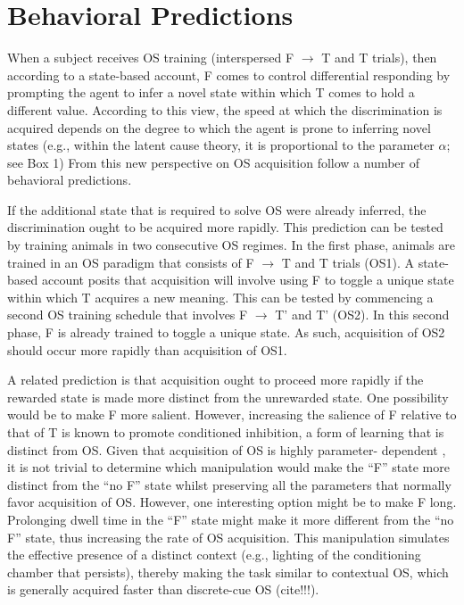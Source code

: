 \documentclass[11pt]{article}
\let\cite=\citep
\begin{document}
\section*{Behavioral Predictions}

When a subject receives OS training (interspersed F $\rightarrow$ T and T 
trials), then according to a state-based account, F comes to control 
differential responding by prompting the agent to infer a novel state within 
which T comes to hold a different value. According to this view, the speed at 
which the discrimination is acquired depends on the degree to which the agent 
is prone to inferring novel states (e.g., within the latent cause theory, it is 
proportional to the parameter $\alpha$; see Box 1) From this new perspective on 
OS acquisition follow a number of behavioral predictions.

If the additional state that is required to solve OS were already inferred, the 
discrimination ought to be acquired more rapidly. This prediction can be tested 
by training animals in two consecutive OS regimes. In the first phase, animals 
are trained in an OS paradigm that consists of F $\rightarrow$ T and T trials 
(OS1). A state-based account posits that acquisition will involve using F to 
toggle a unique state within which T acquires a new meaning. This can be tested 
by commencing a second OS training schedule that involves F $\rightarrow$ T' 
and T' (OS2). In this second phase, F is already trained to toggle a unique 
state. As such, acquisition of OS2 should occur more rapidly than acquisition 
of OS1. 

A related prediction is that acquisition ought to proceed more rapidly if the 
rewarded state is made more distinct from the unrewarded state. One possibility 
would be to make F more salient. However, increasing the salience of F relative 
to that of T is known to promote conditioned inhibition, a form of learning 
that is distinct from OS. Given that acquisition of OS is highly parameter-
dependent \cite{Holland1992}, it is not trivial to determine which manipulation 
would make the ``F'' state more distinct from the ``no F'' state whilst 
preserving all the parameters that normally favor acquisition of OS. However, 
one interesting option might be to make F long. Prolonging dwell time in the 
``F'' state might make it more different from the ``no F'' state, thus 
increasing the rate of OS acquisition. This manipulation simulates the 
effective presence of a distinct context (e.g., lighting of the conditioning 
chamber that persists), thereby making the task similar to contextual OS, which 
is generally acquired faster than discrete-cue OS (cite!!!). 
\end{document}
